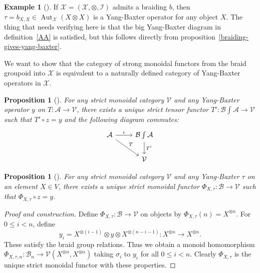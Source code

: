 \documentclass[reqno]{amsart}
\newtheorem{proposition}[theorem]{Proposition}
\theoremstyle{definition}
\newtheorem{example}[theorem]{Example}
\theoremstyle{remark}
\DeclareMathOperator{\Aut}{Aut}
\begin{document}
     \begin{example}[]
         If $\mathcal{X} = \left( 
         \mathcal{X, \otimes, I}\right) $ admits a braiding
         $b$, then $\tau = b_{X,X} \in 
         \Aut_{\mathcal{X}} \left( X \otimes X \right) $ 
         is a Yang-Baxter operator for any object
         $X$. The thing that needs verifying here
         is that the big Yang-Baxter diagram in definition~\ref{AA}
         is satisfied, but
         this follows directly from
         proposition~\ref{braiding-gives-yang-baxter}.
     \end{example}


     We want to show that the category of strong
     monoidal functors from the braid groupoid
     into $\mathcal{X}$ is equivalent to a naturally
     defined category of Yang-Baxter operators in
     $\mathcal{X}$.

     \begin{proposition}[]
         For any strict monoidal category $\mathcal{V}$ and
         any Yang-Baxter operator $y$ on $T \colon
         \mathcal{A} \to \mathcal{V}$, there exists
         a unique strict tensor functor
         $T' \colon \mathcal{B} \int \mathcal{A} \to \mathcal{V}$ 
         such that $T' \circ z = y$ and
         the following diagram commutes:
         \begin{equation*}
         \begin{tikzcd}
             \mathcal{A} \ar[r, "\iota"] \ar[rd, "T"] & 
             \mathcal{B} \int \mathcal{A} \ar[d, "T'"] \\
                                                      & \mathcal{V}
         \end{tikzcd}
         \end{equation*}
         
     \end{proposition}

     \begin{proposition}[]
         For any strict monoidal category $\mathcal{V}$ and
         any Yang-Baxter $\tau$ on an element $X \in V$, there
         exists a unique strict monoidal functor
         $\Phi_{X, \tau} \colon \mathcal{B} \to \mathcal{V}$ such that
         $\Phi_{X, \tau} \circ z = y$.
     \end{proposition}

     \begin{proof}[Proof and construction]
         Define $\Phi_{X, \tau} \colon \mathcal{B} \to \mathcal{V}$ 
         on objects by $\Phi_{X,\tau} (n) = 
         X^{\otimes n}$. For
         $0 \le i < n$, define 
         \[
         y_i = X^{\otimes (i-1)} \otimes y 
         \otimes X^{\otimes (n-i-1)} \colon X^{\otimes n} \to 
         X^{\otimes n}.
         \] 
         These satisfy the braid group relations.
         Thus we obtain a monoid homomorphism
         $\Phi_{X, \tau, n} \colon \mathcal{B}_n \to 
         \mathcal{V} \left( X^{\otimes n}, X^{\otimes n} \right) $ 
         taking $\sigma_i$ to $y_i$ for all
         $0 \le i <n$. Clearly $\Phi_{X, \tau}$ is the unique
         strict monoidal functor with these properties.
     \end{proof}
\end{document}
